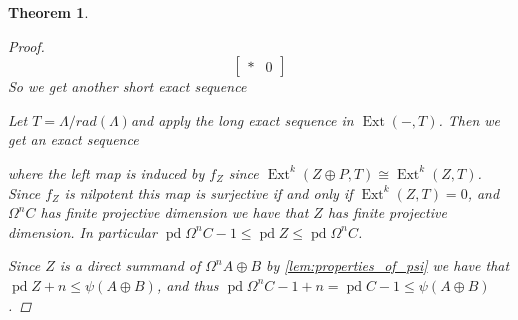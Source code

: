 \documentclass[11pt, a4paper, english]{article}
\newtheorem{theorem}{Theorem}[section]
\theoremstyle{definition}
\DeclareMathOperator{\Ext}{Ext}
\DeclareMathOperator{\pd}{pd}
\begin{document}
\begin{theorem}
\begin{proof}
$$\begin{bmatrix}
		* & 0
		\end{bmatrix} $$
		So we get another short exact sequence
		\begin{center}
		\end{center}
		Let $T = \Lambda/rad(\Lambda)$and apply the long exact sequence in $\Ext(-, T)$. Then we get an exact sequence
		\begin{center}
		\end{center}
		where the left map is induced by $f_Z$ since $\Ext^k(Z \oplus P, T) \cong \Ext^k(Z, T)$. Since $f_Z$ is nilpotent this map is surjective if and only if $\Ext^k(Z, T)=0$, and $\Omega^nC$ has finite projective dimension we have that $Z$ has finite projective dimension. In particular $\pd\Omega^n C -1 \leq \pd Z \leq \pd\Omega^n C$.
		
		Since $Z$ is a direct summand of $\Omega^n A\oplus B$ by \cref{lem:properties_of_psi} we have that $\pd Z + n \leq \psi(A \oplus B)$, and thus $\pd \Omega^n C - 1 + n = \pd C - 1 \leq \psi(A \oplus B)$.
	\end{proof}
\end{theorem}
\end{document}
